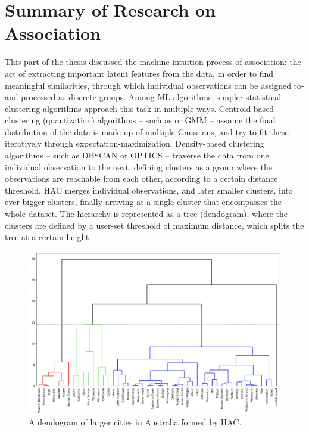 \chapter{Summary of Research on Association}
	\label{cha:sum_association}
	
	This part of the thesis discussed the machine intuition process of association: the act of extracting important latent features from the data, in order to find meaningful similarities, through which individual observations can be assigned to- and processed as discrete groups.
	Among \ac{ML} algorithms, simpler statistical clustering algorithms approach this task in multiple ways.
	Centroid-based clustering (quantization) algorithms -- such as \kmeans{} or \ac{GMM} -- assume the final distribution of the data is made up of multiple Gaussians, and try to fit these iteratively through expectation-maximization.
	Density-based clustering algorithms -- such as \ac{DBSCAN} or \ac{OPTICS} \cite{dbscan, optics} -- traverse the data from one individual observation to the next, defining clusters as a group where the observations are reachable from each other, according to a certain distance threshold.
	\ac{HAC} merges individual observations, and later smaller clusters, into ever bigger clusters, finally arriving at a single cluster that encompasses the whole dataset.
	The hierarchy is represented as a tree (dendogram), where the clusters are defined by a user-set threshold of maximum distance, which splits the tree at a certain height.
	
	\begin{figure}[ht]
		\centering
		\includegraphics[width=0.5\linewidth]{figures/08_sum_association/hac/hac.png}
		\caption[HAC dendogram illustration]{A dendogram of larger cities in Australia formed by HAC.}
		\label{fig:hac}
	\end{figure}
	
